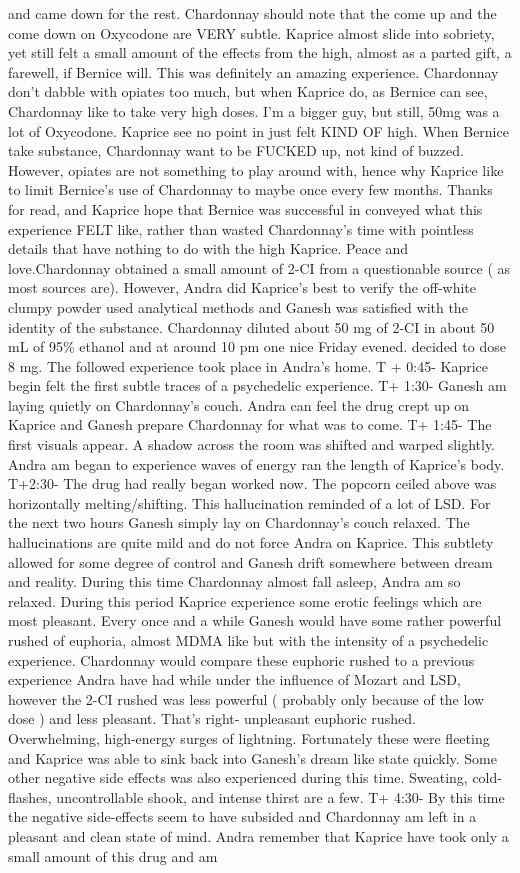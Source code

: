 \documentclass[12pt]{book}
\begin{document}
and came down for the rest. Chardonnay should note that the come up and the come down on Oxycodone are VERY subtle. Kaprice almost slide into sobriety, yet still felt a small amount of the effects from the high, almost as a parted gift, a farewell, if Bernice will. This was definitely an amazing experience. Chardonnay don't dabble with opiates too much, but when Kaprice do, as Bernice can see, Chardonnay like to take very high doses. I'm a bigger guy, but still, 50mg was a lot of Oxycodone. Kaprice see no point in just felt KIND OF high. When Bernice take substance, Chardonnay want to be FUCKED up, not kind of buzzed. However, opiates are not something to play around with, hence why Kaprice like to limit Bernice's use of Chardonnay to maybe once every few months. Thanks for read, and Kaprice hope that Bernice was successful in conveyed what this experience FELT like, rather than wasted Chardonnay's time with pointless details that have nothing to do with the high Kaprice. Peace and love.Chardonnay obtained a small amount of 2-CI from a questionable source ( as most sources are). However, Andra did Kaprice's best to verify the off-white clumpy powder used analytical methods and Ganesh was satisfied with the identity of the substance. Chardonnay diluted about 50 mg of 2-CI in about 50 mL of 95\% ethanol and at around 10 pm one nice Friday evened. decided to dose 8 mg. The followed experience took place in Andra's home. T + 0:45- Kaprice begin felt the first subtle traces of a psychedelic experience. T+ 1:30- Ganesh am laying quietly on Chardonnay's couch. Andra can feel the drug crept up on Kaprice and Ganesh prepare Chardonnay for what was to come. T+ 1:45- The first visuals appear. A shadow across the room was shifted and warped slightly. Andra am began to experience waves of energy ran the length of Kaprice's body. T+2:30- The drug had really began worked now. The popcorn ceiled above was horizontally melting/shifting. This hallucination reminded of a lot of LSD. For the next two hours Ganesh simply lay on Chardonnay's couch relaxed. The hallucinations are quite mild and do not force Andra on Kaprice. This subtlety allowed for some degree of control and Ganesh drift somewhere between dream and reality. During this time Chardonnay almost fall asleep, Andra am so relaxed. During this period Kaprice experience some erotic feelings which are most pleasant. Every once and a while Ganesh would have some rather powerful rushed of euphoria, almost MDMA like but with the intensity of a psychedelic experience. Chardonnay would compare these euphoric rushed to a previous experience Andra have had while under the influence of Mozart and LSD, however the 2-CI rushed was less powerful ( probably only because of the low dose ) and less pleasant. That's right- unpleasant euphoric rushed. Overwhelming, high-energy surges of lightning. Fortunately these were fleeting and Kaprice was able to sink back into Ganesh's dream like state quickly. Some other negative side effects was also experienced during this time. Sweating, cold-flashes, uncontrollable shook, and intense thirst are a few. T+ 4:30- By this time the negative side-effects seem to have subsided and Chardonnay am left in a pleasant and clean state of mind. Andra remember that Kaprice have took only a small amount of this drug and am 
\end{document}

